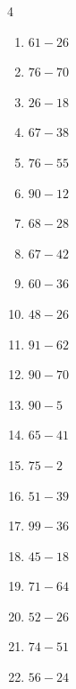 \begin{multicols}{4}
\begin{enumerate}
\columnbreak %

  \item $61-26$
        \phantom{$=35$}

  \item $76-70$
        \phantom{$=6$}

  \item $26-18$
        \phantom{$=8$}

  \item $67-38$
        \phantom{$=29$}

  \item $76-55$
        \phantom{$=21$}

  \item $90-12$
        \phantom{$=78$}

  \item $68-28$
        \phantom{$=40$}

  \item $67-42$
        \phantom{$=25$}

  \item $60-36$
        \phantom{$=24$}

  \item $48-26$
        \phantom{$=22$}

  \item $91-62$
        \phantom{$=29$}

  \item $90-70$
        \phantom{$=20$}

  \item $90-5$
        \phantom{$=85$}

  \item $65-41$
        \phantom{$=24$}

  \item $75-2$
        \phantom{$=73$}

  \item $51-39$
        \phantom{$=12$}

  \item $99-36$
        \phantom{$=63$}

  \item $45-18$
        \phantom{$=27$}

  \item $71-64$
        \phantom{$=7$}

  \item $52-26$
        \phantom{$=26$}

  \item $74-51$
        \phantom{$=23$}

  \item $56-24$
        \phantom{$=32$}


\end{enumerate}
\end{multicols}
